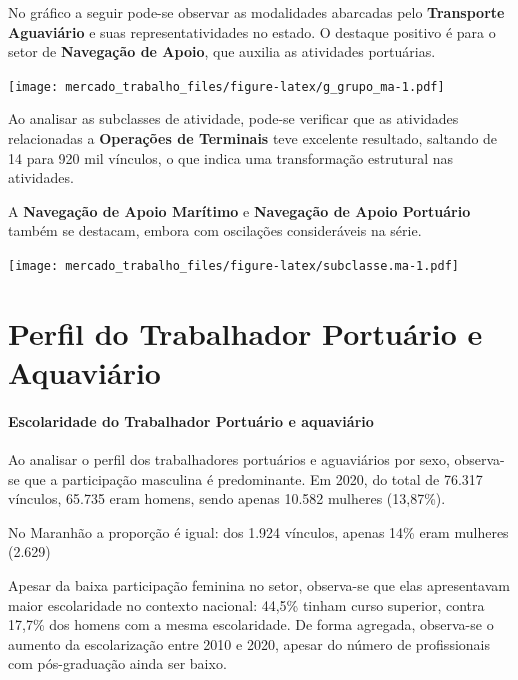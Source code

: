 \documentclass[
]{article}
\begin{document}
No gráfico a seguir pode-se observar as modalidades abarcadas pelo
\textbf{Transporte Aguaviário} e suas representatividades no estado. O
destaque positivo é para o setor de \textbf{Navegação de Apoio}, que
auxilia as atividades portuárias.

\texttt{[image: mercado\_trabalho\_files/figure-latex/g\_grupo\_ma-1.pdf]}

Ao analisar as subclasses de atividade, pode-se verificar que as
atividades relacionadas a \textbf{Operações de Terminais} teve excelente
resultado, saltando de 14 para 920 mil vínculos, o que indica uma
transformação estrutural nas atividades.

A \textbf{Navegação de Apoio Marítimo} e \textbf{Navegação de Apoio
Portuário} também se destacam, embora com oscilações consideráveis na
série.

\texttt{[image: mercado\_trabalho\_files/figure-latex/subclasse.ma-1.pdf]}

\hypertarget{perfil-do-trabalhador-portuuxe1rio-e-aquaviuxe1rio}{%
\section{Perfil do Trabalhador Portuário e
Aquaviário}\label{perfil-do-trabalhador-portuuxe1rio-e-aquaviuxe1rio}}

\hypertarget{escolaridade-do-trabalhador-portuuxe1rio-e-aquaviuxe1rio}{%
\paragraph{Escolaridade do Trabalhador Portuário e
aquaviário}\label{escolaridade-do-trabalhador-portuuxe1rio-e-aquaviuxe1rio}}

Ao analisar o perfil dos trabalhadores portuários e aguaviários por
sexo, observa-se que a participação masculina é predominante. Em 2020,
do total de 76.317 vínculos, 65.735 eram homens, sendo apenas 10.582
mulheres (13,87\%).

No Maranhão a proporção é igual: dos 1.924 vínculos, apenas 14\% eram
mulheres (2.629)

Apesar da baixa participação feminina no setor, observa-se que elas
apresentavam maior escolaridade no contexto nacional: 44,5\% tinham
curso superior, contra 17,7\% dos homens com a mesma escolaridade. De
forma agregada, observa-se o aumento da escolarização entre 2010 e 2020,
apesar do número de profissionais com pós-graduação ainda ser baixo.
\end{document}
